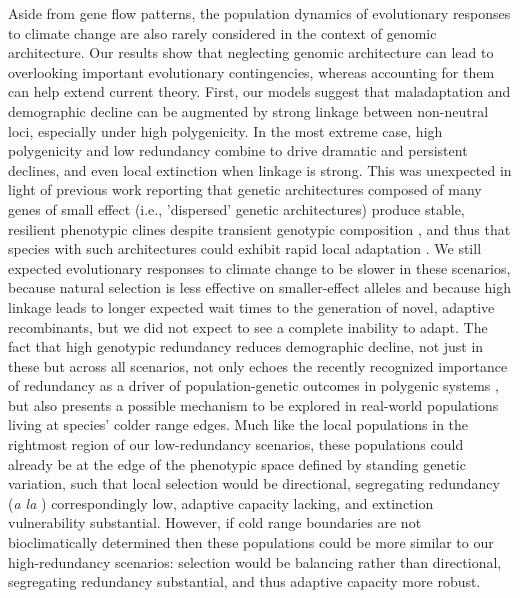 \documentclass[9pt,twocolumn,twoside,lineno]{pnas-new}
\begin{document}
Aside from gene flow patterns, the population dynamics of evolutionary responses
to climate change are also rarely considered in the context of genomic architecture.
Our results show that neglecting genomic architecture
can lead to overlooking important evolutionary contingencies,
whereas accounting for them can help extend current theory.
First, our models suggest that maladaptation and demographic decline
can be augmented by strong linkage between non-neutral loci,
especially under high polygenicity. 
In the most extreme case, high polygenicity and low redundancy
combine to drive dramatic and persistent declines,
and even local extinction when linkage is strong.
This was unexpected in light of previous work reporting that genetic architectures composed
of many genes of small effect (i.e., 'dispersed' genetic architectures) produce stable,
resilient phenotypic clines despite transient genotypic composition \cite{yeaman_amnat,yeaman_review},
and thus that species with such architectures
could exhibit rapid local adaptation \cite{aitken_yeaman}. 
We still expected evolutionary responses to climate change
to be slower in these scenarios,
because natural selection is less effective on smaller-effect alleles
and because high linkage leads to longer expected wait times to the generation
of novel, adaptive recombinants, but we did not expect
to see a complete inability to adapt.
The fact that high genotypic redundancy reduces demographic decline,
not just in these but across all scenarios,
not only echoes the recently recognized importance of redundancy
as a driver of population-genetic outcomes in polygenic systems
\cite{laruson,yeaman_review},
but also presents a possible mechanism to be explored
in real-world populations living at species' colder range edges.
Much like the local populations in the rightmost region of our low-redundancy scenarios,
these populations could already be at the edge of the phenotypic space defined by
standing genetic variation, such that local selection would be directional,
segregating redundancy (\textit{a la} \cite{laruson}) correspondingly low,
adaptive capacity lacking, and extinction vulnerability substantial.
However, if cold range boundaries are not bioclimatically determined then
these populations could be more similar to our high-redundancy scenarios:
selection would be balancing rather than directional,
segregating redundancy substantial, and thus adaptive capacity more robust.
\end{document}
